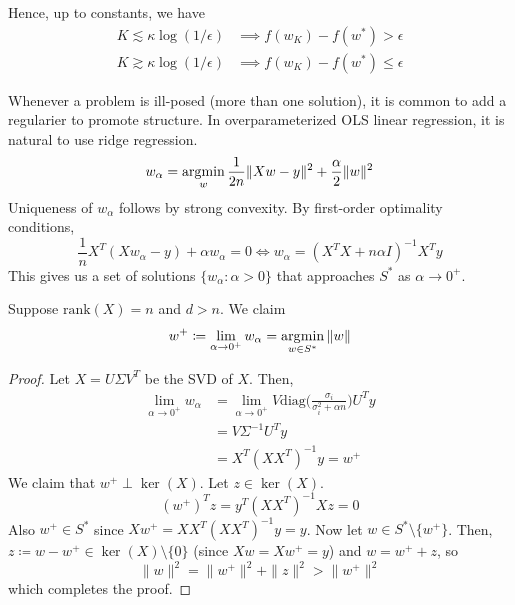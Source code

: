 	Hence, up to constants, we have 
	\begin{align}
		K \lesssim \kappa \log(1/\epsilon) & \implies f(w_K) - f(w^\ast) > \epsilon \\ 
		K \gtrsim \kappa \log(1/\epsilon) & \implies f(w_K) - f(w^\ast) \leq \epsilon
	\end{align}

	\begin{example}
	  \label{ex:implicit-regularization}
	  Whenever a problem is ill-posed (more than one solution), it is common to add a regularier to promote structure. In overparameterized OLS linear regression, it is natural to use ridge regression. 
		\begin{equation}
			w_\alpha = \operatorname*{\arg\!\min}_w \frac{1}{2n} \|Xw - y\|^2 + \frac{\alpha}{2} \|w\|^2
		\end{equation}
		Uniqueness of $w_\alpha$ follows by strong convexity. By first-order optimality conditions, 
		\begin{equation}
			\frac{1}{n} X^T (Xw_\alpha - y) + \alpha w_\alpha = 0 \iff w_\alpha = (X^T X + n \alpha I)^{-1} X^T y
		\end{equation}
		This gives us a set of solutions $\{w_\alpha \colon \alpha > 0\}$ that approaches $S^\ast$ as $\alpha \to 0^+$. 
	\end{example}

	\begin{lemma}
	  \label{thm:limit-of-the-gradient-flow-path}
 
	  Suppose $\mathrm{rank}(X) = n$ and $d > n$. We claim 
		\begin{equation}
			w^+ \coloneqq \lim_{\alpha \to 0^+} w_\alpha  = \operatorname*{\arg\!\min}_{w \in S^\ast} \|w\|
		\end{equation}
	\end{lemma}
	\begin{proof}
	  Let $X = U \Sigma V^T$ be the SVD of $X$. Then, 
		\begin{align}
			\lim_{\alpha \to 0^+} w_\alpha & = \lim_{\alpha \to 0^+} V \mathrm{diag} \big( \frac{\sigma_i}{\sigma_i^2 + \alpha n} \big) U^T y \\ 
														& = V \Sigma^{-1} U^T y \\ 
														& = X^T (XX^T)^{-1} y = w^+
		\end{align}
		We claim that $w^+ \perp \ker(X)$. Let $z \in \ker(X)$. 
		\begin{equation}
			(w^+)^T z = y^T (X X^T)^{-1} X z = 0
		\end{equation}
		Also $w^+ \in S^\ast$ since $X w^+ = X X^T (XX^T)^{-1} y = y$. Now let $w \in S^\ast \setminus \{w^+\}$. Then, $z \coloneqq w - w^+ \in \ker(X) \setminus \{0\}$ (since $Xw = Xw^+ = y$) and $w = w^+ + z$, so 
		\begin{equation}
			\|w\|^2 = \|w^+\|^2 + \|z\|^2 > \|w^+\|^2
		\end{equation}
		which completes the proof. 
	\end{proof}

